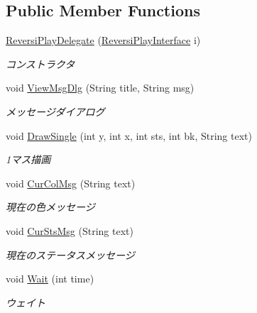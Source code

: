 \subsection*{Public Member Functions}
\begin{DoxyCompactItemize}
\item 
\hyperlink{classjp_1_1gr_1_1java__conf_1_1yuta__yoshinaga_1_1reversi_1_1model_1_1_reversi_play_delegate_a96161500c0097098e158b834ac13102c}{Reversi\+Play\+Delegate} (\hyperlink{interfacejp_1_1gr_1_1java__conf_1_1yuta__yoshinaga_1_1reversi_1_1model_1_1_reversi_play_interface}{Reversi\+Play\+Interface} i)
\begin{DoxyCompactList}\small\item\em コンストラクタ \end{DoxyCompactList}\item 
void \hyperlink{classjp_1_1gr_1_1java__conf_1_1yuta__yoshinaga_1_1reversi_1_1model_1_1_reversi_play_delegate_acdb644250451a30317ce0518191292a5}{View\+Msg\+Dlg} (String title, String msg)
\begin{DoxyCompactList}\small\item\em メッセージダイアログ \end{DoxyCompactList}\item 
void \hyperlink{classjp_1_1gr_1_1java__conf_1_1yuta__yoshinaga_1_1reversi_1_1model_1_1_reversi_play_delegate_ab72825782a2d5cfce2ddeb0add42143e}{Draw\+Single} (int y, int x, int sts, int bk, String text)
\begin{DoxyCompactList}\small\item\em 1マス描画 \end{DoxyCompactList}\item 
void \hyperlink{classjp_1_1gr_1_1java__conf_1_1yuta__yoshinaga_1_1reversi_1_1model_1_1_reversi_play_delegate_a3654121208eb28bbd4972b2835665a73}{Cur\+Col\+Msg} (String text)
\begin{DoxyCompactList}\small\item\em 現在の色メッセージ \end{DoxyCompactList}\item 
void \hyperlink{classjp_1_1gr_1_1java__conf_1_1yuta__yoshinaga_1_1reversi_1_1model_1_1_reversi_play_delegate_a775f366a6cbb877fe8ea577ef869d6b5}{Cur\+Sts\+Msg} (String text)
\begin{DoxyCompactList}\small\item\em 現在のステータスメッセージ \end{DoxyCompactList}\item 
void \hyperlink{classjp_1_1gr_1_1java__conf_1_1yuta__yoshinaga_1_1reversi_1_1model_1_1_reversi_play_delegate_a1adfbc7bcedb4f06a5d3b1b30f13116b}{Wait} (int time)
\begin{DoxyCompactList}\small\item\em ウェイト \end{DoxyCompactList}\end{DoxyCompactItemize}
